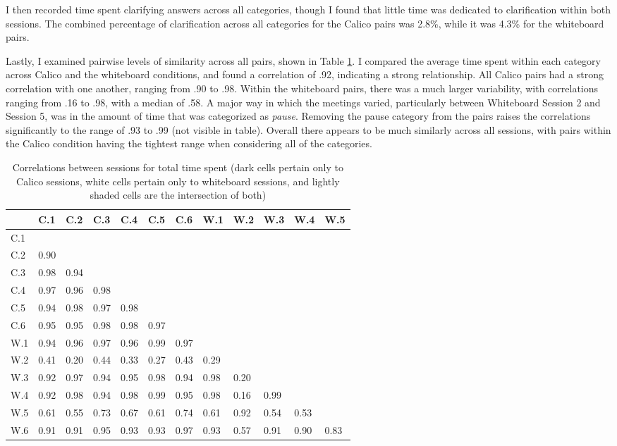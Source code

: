 \documentclass[12pt,fleqn]{ucithesis}
\begin{document}
I then recorded time spent clarifying answers across all categories, though I found that little time was dedicated to clarification within both sessions. The combined percentage of clarification across all categories for the Calico pairs was 2.8\%, while it was 4.3\% for the whiteboard pairs. 

Lastly, I examined pairwise levels of similarity across all pairs, shown in Table \ref{table:3}. I compared the average time spent within each category across Calico and the whiteboard conditions, and found a correlation of .92, indicating a strong relationship. All Calico pairs had a strong correlation with one another, ranging from .90 to .98. Within the whiteboard pairs, there was a much larger variability, with correlations ranging from .16 to .98, with a median of .58. A major way in which the meetings varied, particularly between Whiteboard Session 2 and Session 5, was in the amount of time that was categorized as \emph{pause}. Removing the pause category from the pairs raises the correlations significantly to the range of .93 to .99 (not visible in table). Overall there appears to be much similarly across all sessions, with pairs within the Calico condition having the tightest range when considering all of the categories.

\begin{table}
\centering
\caption{Correlations between sessions for total time spent (dark cells pertain only to Calico sessions, white cells pertain only to whiteboard sessions, and lightly shaded cells are the intersection of both)}
\begin{tabular}{ p{0.5cm}p{0.5cm}p{0.5cm}p{0.5cm}p{0.5cm}p{0.5cm}p{0.5cm}p{0.5cm}p{0.5cm}p{0.5cm}p{0.5cm}p{0.5cm}}
\toprule
&	C.1 &	C.2 &	C.3 &	C.4 &	C.5 &	C.6 &	W.1 &	W.2 &	W.3 &	W.4 &	W.5 \\
\midrule
C.1 	 & & & & & & & & & & & 								 \\		
C.2  &	0.90 & & & & & & & & & & 								 \\		
C.3 & 	0.98 &	0.94 & & & & & & & & & 							 \\		
C.4 & 	0.97 &	0.96 &	0.98 & & & & & & & & 						 \\		
C.5 & 	0.94 &	0.98 &	0.97 &	0.98 & & & & & & & 						 \\	
C.6 & 	0.95 &	0.95 &	0.98 &	0.98 &	0.97 & & & & & & 					 \\	
W.1 &	0.94 &	0.96 &	0.97 &	0.96 &	0.99 &	0.97 & & & & & 				 \\	
W.2 &	0.41 &	0.20 &	0.44 &	0.33 &	0.27 &	0.43 &	0.29 & & & & 			 \\	
W.3 &	0.92 &	0.97 &	0.94 &	0.95 &	0.98 &	0.94 &	0.98 &	0.20 & & & 			 \\
W.4 &	0.92 &	0.98 &	0.94 &	0.98 &	0.99 &	0.95 &	0.98 &	0.16 &	0.99 & & 		 \\
W.5 &	0.61 &	0.55 &	0.73 &	0.67 &	0.61 &	0.74 &	0.61 &	0.92 &	0.54 &	0.53 & 	 \\
W.6 &	0.91 &	0.91 &	0.95 &	0.93 &	0.93 &	0.97 &	0.93 &	0.57 &	0.91 &	0.90 &	0.83 	\\
\bottomrule
\end{tabular}
\label{table:3}
\end{table}
\end{document}
